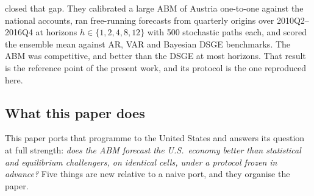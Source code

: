 \documentclass[11pt,a4paper]{article}
\begin{document}
\citet{poledna2023} closed that gap. They calibrated a large ABM of Austria one-to-one against the
national accounts, ran free-running forecasts from quarterly origins over 2010Q2--2016Q4 at
horizons $h \in \{1,2,4,8,12\}$ with 500 stochastic paths each, and scored the ensemble mean
against AR, VAR and Bayesian DSGE benchmarks. The ABM was competitive, and better than the DSGE at
most horizons. That result is the reference point of the present work, and its protocol is the one
reproduced here.

\subsection{What this paper does}

This paper ports that programme to the United States and answers its question at full strength:
\emph{does the ABM forecast the U.S.\ economy better than statistical and equilibrium challengers,
on identical cells, under a protocol frozen in advance?} Five things are new relative to a naive
port, and they organise the paper.
\end{document}
